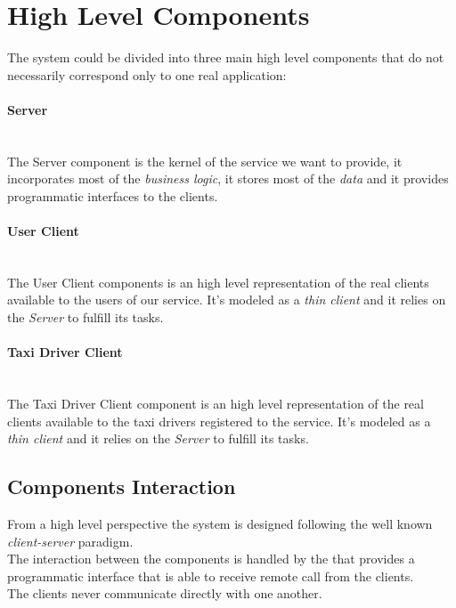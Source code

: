 \section{High Level Components} %
\label{sec:high_level_components}
The system could be divided into three main high level components that do not necessarily correspond only to one real application:
\paragraph{Server} %
\label{comp:server}\hfill \\
The Server component is the kernel of the service we want to provide, it incorporates most of the \emph{business logic}, it stores most of the \emph{data} and it provides programmatic interfaces to the clients.
\paragraph{User Client} %
\label{comp:user_client}\hfill \\
The User Client components is an high level representation of the real clients available to the users of our service. It's modeled as a \emph{thin client} and it relies on the \emph{Server} to fulfill its tasks.
\paragraph{Taxi Driver Client} %
\label{par:taxi_driver_client}\hfill \\
The Taxi Driver Client component is an high level representation of the real clients available to the taxi drivers registered to the service. It's modeled as a \emph{thin client} and it relies on the \emph{Server} to fulfill its tasks.


\subsection{Components Interaction} %
\label{ssub:components_interaction}
From a high level perspective the system is designed following the well known \emph{client-server} paradigm.\\
The interaction between the components is handled by the  that provides a programmatic interface that is able to receive remote call from the clients.\\
The clients never communicate directly with one another.
